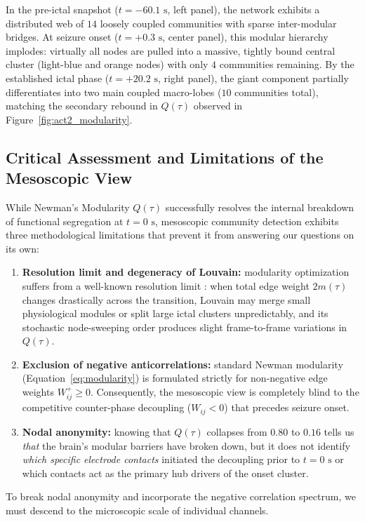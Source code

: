 In the pre-ictal snapshot ($t = -60.1\text{ s}$, left panel), the network exhibits a distributed web of $14$ loosely coupled communities with sparse inter-modular bridges. At seizure onset ($t = +0.3\text{ s}$, center panel), this modular hierarchy implodes: virtually all nodes are pulled into a massive, tightly bound central cluster (light-blue and orange nodes) with only $4$ communities remaining. By the established ictal phase ($t = +20.2\text{ s}$, right panel), the giant component partially differentiates into two main coupled macro-lobes ($10$ communities total), matching the secondary rebound in $Q(\tau)$ observed in Figure~\ref{fig:act2_modularity}.

\subsection{Critical Assessment and Limitations of the Mesoscopic View}
While Newman's Modularity $Q(\tau)$ successfully resolves the internal breakdown of functional segregation at $t = 0\text{ s}$, mesoscopic community detection exhibits three methodological limitations that prevent it from answering our questions on its own:
\begin{enumerate}
    \item \textbf{Resolution limit and degeneracy of Louvain:} modularity optimization suffers from a well-known resolution limit \cite{newman2018networks}: when total edge weight $2m(\tau)$ changes drastically across the transition, Louvain may merge small physiological modules or split large ictal clusters unpredictably, and its stochastic node-sweeping order produces slight frame-to-frame variations in $Q(\tau)$.
    \item \textbf{Exclusion of negative anticorrelations:} standard Newman modularity (Equation~\ref{eq:modularity}) is formulated strictly for non-negative edge weights $W_{ij}^{+} \geq 0$. Consequently, the mesoscopic view is completely blind to the competitive counter-phase decoupling ($W_{ij} < 0$) that precedes seizure onset.
    \item \textbf{Nodal anonymity:} knowing that $Q(\tau)$ collapses from $0.80$ to $0.16$ tells us \textit{that} the brain's modular barriers have broken down, but it does not identify \textit{which specific electrode contacts} initiated the decoupling prior to $t = 0\text{ s}$ or which contacts act as the primary hub drivers of the onset cluster.
\end{enumerate}
To break nodal anonymity and incorporate the negative correlation spectrum, we must descend to the microscopic scale of individual channels.

